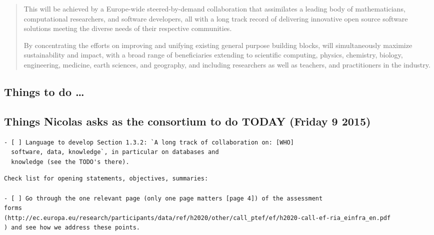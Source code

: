 \documentclass[noworkareas,deliverables,\classoptions]{euproposal}       %
\begin{document}
\begin{proposal}
\begin{abstract}
  This will be achieved by a Europe-wide steered-by-demand
  collaboration that assimilates a leading body of mathematicians,
  computational researchers, and software developers, all with a long
  track record of delivering innovative open source software solutions
  meeting the diverse needs of their respective communities.

  By concentrating the efforts on improving and unifying existing
  general purpose building blocks, \TheProject will simultaneously
  maximize sustainability and impact, with a broad range of
  beneficiaries extending to scientific computing, physics, chemistry,
  biology, engineering, medicine, earth sciences, and geography, and
  including researchers as well as teachers, and practitioners in the
  industry.

\end{abstract}
\ifsubmit\else\setcounter{tocdepth}{4}\fi
\tableofcontents



\begin{draft}
\section*{Things to do \dots}
\subsection*{Things Nicolas asks as the consortium to do TODAY (Friday 9 2015)}
\begin{verbatim}
- [ ] Language to develop Section 1.3.2: `A long track of collaboration on: [WHO]
  software, data, knowledge`, in particular on databases and
  knowledge (see the TODO's there).
\end{verbatim}

\end{draft}
\begin{draft}

\begin{verbatim}
Check list for opening statements, objectives, summaries:

- [ ] Go through the one relevant page (only one page matters [page 4]) of the assessment
forms
(http://ec.europa.eu/research/participants/data/ref/h2020/other/call_ptef/ef/h2020-call-ef-ria_einfra_en.pdf
) and see how we address these points. 


\end{verbatim}
\end{draft}
\end{proposal}
\end{document}
